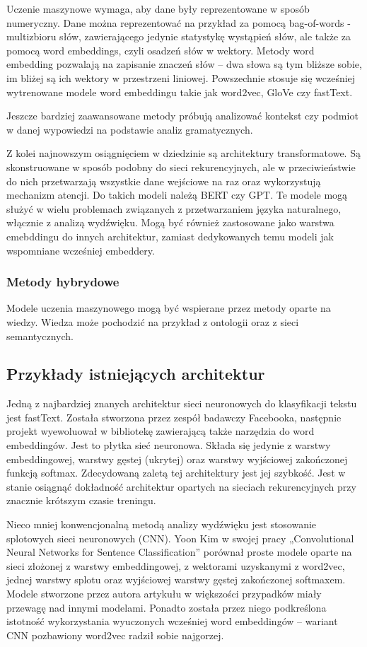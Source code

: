 Uczenie maszynowe wymaga, aby dane były reprezentowane w sposób numeryczny. Dane można 
reprezentować na przykład za pomocą bag-of-words - multizbioru słów, zawierającego jedynie
statystykę wystąpień słów, ale także za pomocą word embeddings, czyli osadzeń słów w wektory.
Metody word embedding pozwalają na zapisanie znaczeń słów -- dwa słowa są tym bliższe sobie,
im bliżej są ich wektory w przestrzeni liniowej. Powszechnie stosuje się wcześniej wytrenowane
modele word embeddingu takie jak word2vec, GloVe czy fastText.

Jeszcze bardziej zaawansowane metody próbują analizować kontekst czy podmiot w danej wypowiedzi
na podstawie analiz gramatycznych.

Z kolei najnowszym osiągnięciem w dziedzinie są architektury transformatowe. Są skonstruowane
w sposób podobny do sieci rekurencyjnych, ale w przeciwieństwie do nich przetwarzają wszystkie
dane wejściowe na raz oraz wykorzystują mechanizm atencji. Do takich modeli należą BERT czy
GPT. Te modele mogą służyć w wielu problemach związanych z przetwarzaniem języka naturalnego,
włącznie z analizą wydźwięku. Mogą być również zastosowane jako warstwa emebddingu do innych
architektur, zamiast dedykowanych temu modeli jak wspomniane wcześniej embeddery.

\subsubsection{Metody hybrydowe}
Modele uczenia maszynowego mogą być wspierane przez metody oparte na wiedzy. Wiedza może
pochodzić na przykład z ontologii oraz z sieci semantycznych.

\subsection{Przykłady istniejących architektur}
Jedną z najbardziej znanych architektur sieci neuronowych do klasyfikacji tekstu
jest fastText. Została stworzona przez zespół badawczy Facebooka, następnie projekt wyewoluował
w bibliotekę zawierającą także narzędzia do word embeddingów. Jest to płytka sieć neuronowa.
Składa się jedynie z warstwy embeddingowej, warstwy gęstej (ukrytej) oraz warstwy wyjściowej
zakończonej funkcją softmax. Zdecydowaną zaletą tej architektury jest jej szybkość. Jest
w stanie osiągnąć dokładność architektur opartych na sieciach rekurencyjnych przy znacznie
krótszym czasie treningu.

Nieco mniej konwencjonalną metodą analizy wydźwięku jest stosowanie splotowych
sieci neuronowych (CNN). Yoon Kim w swojej pracy „Convolutional Neural Networks for Sentence 
Classification” porównał proste modele oparte na sieci złożonej z warstwy embeddingowej,
z wektorami uzyskanymi z word2vec, jednej warstwy splotu oraz wyjściowej warstwy
gęstej zakończonej softmaxem. Modele stworzone przez autora artykułu w większości
przypadków miały przewagę nad innymi modelami. Ponadto została przez niego podkreślona istotność
wykorzystania wyuczonych wcześniej word embeddingów -- wariant CNN pozbawiony word2vec
radził sobie najgorzej.
